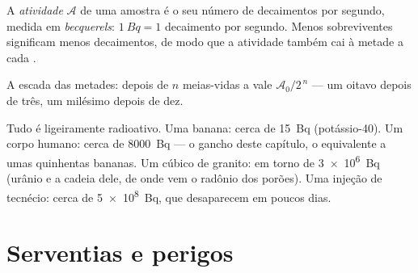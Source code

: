 \begin{definition}[Atividade]\label{def:g11:nucleus-radioactivity:activity}
A \emph{atividade} $\mathcal A$ de uma amostra é o seu
número de decaimentos por segundo, medida em
\emph{becquerels}: $\qty{1}{Bq} = 1$ decaimento por
segundo. Menos  sobreviventes significam menos decaimentos, de modo
que a atividade também cai à metade a cada .
\end{definition}

\begin{omfigure}

{\small A escada das metades: depois de $n$ meias-vidas a  vale
$\mathcal A_0/2^{\,n}$ --- um oitavo depois de três, um milésimo depois
de dez.}
\end{omfigure}

\begin{example}\label{ex:g11:nucleus-radioactivity:orders}
Tudo é ligeiramente radioativo. Uma banana: cerca de \qty{15}{Bq}
(potássio-40). Um corpo humano: cerca de \qty{8000}{Bq} --- o gancho
deste capítulo, o equivalente a umas quinhentas bananas. Um  cúbico
de granito: em torno de \qty{3e6}{Bq} (urânio e a cadeia dele, de onde
vem o radônio dos porões). Uma injeção de tecnécio: cerca de
\qty{5e8}{Bq}, que desaparecem em poucos dias.
\end{example}

\section{Serventias e perigos}

